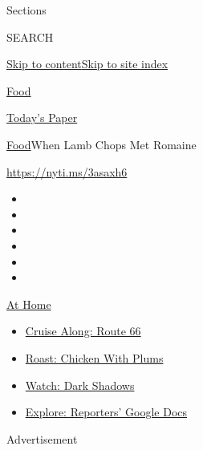 Sections

SEARCH

\protect\hyperlink{site-content}{Skip to
content}\protect\hyperlink{site-index}{Skip to site index}

\href{https://www.nytimes3xbfgragh.onion/section/food}{Food}

\href{https://myaccount.nytimes3xbfgragh.onion/auth/login?response_type=cookie\&client_id=vi}{}

\href{https://www.nytimes3xbfgragh.onion/section/todayspaper}{Today's
Paper}

\href{/section/food}{Food}\textbar{}When Lamb Chops Met Romaine

\url{https://nyti.ms/3asaxh6}

\begin{itemize}
\item
\item
\item
\item
\item
\item
\end{itemize}

\href{https://www.nytimes3xbfgragh.onion/spotlight/at-home?action=click\&pgtype=Article\&state=default\&region=TOP_BANNER\&context=at_home_menu}{At
Home}

\begin{itemize}
\tightlist
\item
  \href{https://www.nytimes3xbfgragh.onion/2020/09/07/travel/route-66.html?action=click\&pgtype=Article\&state=default\&region=TOP_BANNER\&context=at_home_menu}{Cruise
  Along: Route 66}
\item
  \href{https://www.nytimes3xbfgragh.onion/2020/09/04/dining/sheet-pan-chicken.html?action=click\&pgtype=Article\&state=default\&region=TOP_BANNER\&context=at_home_menu}{Roast:
  Chicken With Plums}
\item
  \href{https://www.nytimes3xbfgragh.onion/2020/09/04/arts/television/dark-shadows-stream.html?action=click\&pgtype=Article\&state=default\&region=TOP_BANNER\&context=at_home_menu}{Watch:
  Dark Shadows}
\item
  \href{https://www.nytimes3xbfgragh.onion/interactive/2020/at-home/even-more-reporters-editors-diaries-lists-recommendations.html?action=click\&pgtype=Article\&state=default\&region=TOP_BANNER\&context=at_home_menu}{Explore:
  Reporters' Google Docs}
\end{itemize}

Advertisement

